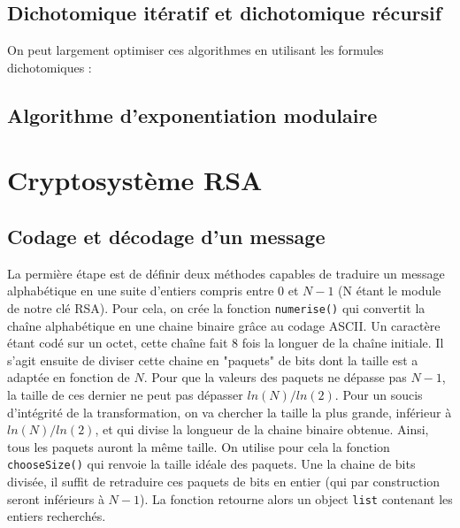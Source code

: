 \documentclass[titlepage]{article}
\begin{document}
    

    \subsection{Dichotomique itératif et dichotomique récursif}

    On peut largement optimiser ces algorithmes en utilisant \- les formules dichotomiques : 

    

    

    \subsection{Algorithme d'exponentiation modulaire}
    \section{Cryptosystème RSA}
    \subsection{Codage et décodage d'un message}
    La permière étape est de définir deux méthodes capables de traduire un message alphabétique en une suite d'entiers compris entre $0$ et $N-1$ (N étant le module de notre clé RSA).
    Pour cela, on crée la fonction \texttt{numerise()} qui convertit la chaîne alphabétique en une chaine binaire grâce au codage ASCII. Un caractère étant codé sur un octet, cette chaîne fait 8 fois la longuer de la chaîne initiale.
    Il s'agit ensuite de diviser cette chaine en "paquets" de bits dont la taille est a adaptée en fonction de $N$.
    Pour que la valeurs des paquets ne dépasse pas $N-1$, la taille de ces dernier ne peut pas dépasser $ln(N)/ln(2)$. Pour un soucis d'intégrité de la transformation, on va chercher la taille la plus grande, inférieur à $ln(N)/ln(2)$, et qui divise la longueur de la chaine binaire obtenue.
    Ainsi, tous les paquets auront la même taille. On utilise pour cela la fonction \texttt{chooseSize()} qui renvoie la taille idéale des paquets.
    Une la chaine de bits divisée, il suffit de retraduire ces paquets de bits en entier (qui par construction seront inférieurs à $N-1$).
    La fonction retourne alors un object \texttt{list} contenant les entiers recherchés.
\end{document}
